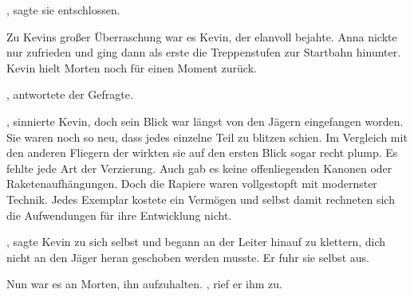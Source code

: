 \par

, sagte sie entschlossen. 

\par

Zu Kevins großer Überraschung war es Kevin, der elanvoll bejahte. Anna nickte nur zufrieden und ging dann als erste die Treppenstufen zur Startbahn hinunter. Kevin hielt Morten noch für einen Moment zurück. 

\par

, antwortete der Gefragte. 

\par

, sinnierte Kevin, doch sein Blick war längst von den Jägern eingefangen worden. Sie waren noch so neu, dass jedes einzelne Teil zu blitzen schien. Im Vergleich mit den anderen Fliegern der  wirkten sie auf den ersten Blick sogar recht plump. Es fehlte jede Art der Verzierung. Auch gab es keine offenliegenden Kanonen oder Raketenaufhängungen. Doch die Rapiere waren vollgestopft mit modernster Technik. Jedes Exemplar kostete ein Vermögen und selbst damit rechneten sich die Aufwendungen für ihre Entwicklung nicht.

\par

, sagte Kevin zu sich selbst und begann an der Leiter hinauf zu klettern, dich nicht an den Jäger heran geschoben werden musste. Er fuhr sie selbst aus.

\par

Nun war es an Morten, ihn aufzuhalten. , rief er ihm zu. 

